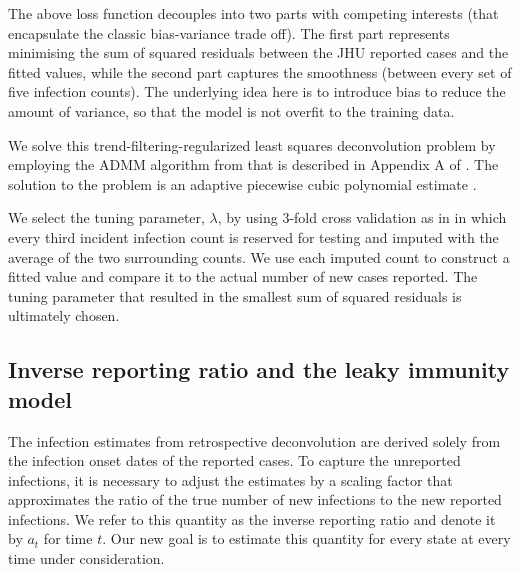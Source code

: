 \documentclass{article}
\begin{document}
The above loss function decouples into two parts with competing interests (that
encapsulate the classic bias-variance trade off). The first part represents
minimising the sum of squared residuals between the JHU reported cases and the
fitted values, while the second part captures the smoothness (between every set
of five infection counts). The underlying idea here is to introduce bias to
reduce the amount of variance, so that the model is not overfit to the training
data.

We solve this trend-filtering-regularized least squares deconvolution problem by
employing the ADMM algorithm from \citet{ramdas2016fast} that is described in
Appendix A of \citet{jahja2022real}. The solution to the problem is an adaptive
piecewise cubic polynomial estimate \citep{tibshirani2014adaptive,
tibshirani2022divided}.

We select the tuning parameter, $\lambda$, by using $3$-fold cross validation as
in \citet{jahja2022real} in which every third incident infection count is
reserved for testing and imputed with the average of the two surrounding counts.
We use each imputed count to construct a fitted value and compare it to the
actual number of new cases reported. The tuning parameter that resulted in the
smallest sum of squared residuals is ultimately chosen.

\subsection{Inverse reporting ratio and the leaky immunity model} 

The infection estimates from retrospective deconvolution are
derived solely from the infection onset dates of the reported cases. 
To capture the unreported infections, it is necessary to adjust the estimates by 
a scaling factor that approximates the ratio of the true number of new infections
to the new reported infections. We refer to this quantity as the
inverse reporting ratio and denote it by $a_t$ for time $t$. Our new goal is
to estimate this quantity for every state at every time under consideration. 
\end{document}
